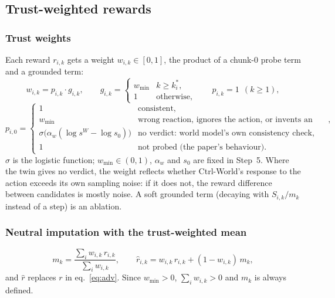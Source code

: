 \documentclass[11pt,a4paper]{article}
\theoremstyle{plain}
\theoremstyle{definition}
\theoremstyle{remark}
\begin{document}
\subsection{Trust-weighted rewards}\label{sec:trust}
\subsubsection{Trust weights}
Each reward $r_{i,k}$ gets a weight $w_{i,k}\in[0,1]$, the product of a chunk-0 probe term and a grounded term:
\begin{equation}
w_{i,k}=p_{i,k}\cdot g_{i,k},\qquad
g_{i,k}=\begin{cases}w_{\min}&k\ge k^\ast_i,\\ 1&\text{otherwise},\end{cases}\qquad
p_{i,k}=1\ \ (k\ge1),
\end{equation}
\begin{equation}
p_{i,0}=\begin{cases}
1 & \text{consistent},\\
w_{\min} & \text{wrong reaction, ignores the action, or invents an effect},\\
\sigma\big(\alpha_w(\log s^W-\log s_0)\big) & \text{no verdict: world model's own consistency check},\\
1 & \text{not probed (the paper's behaviour)}.
\end{cases}
\end{equation}
$\sigma$ is the logistic function; $w_{\min}\in(0,1)$, $\alpha_w$ and $s_0$ are fixed in Step~5. Where the twin gives no verdict, the weight reflects whether Ctrl-World's response to the action exceeds its own sampling noise: if it does not, the reward difference between candidates is mostly noise. A soft grounded term (decaying with $S_{i,k}/m_k$ instead of a step) is an ablation.

\subsubsection{Neutral imputation with the trust-weighted mean}
\begin{equation}\label{eq:neutral}
m_k=\frac{\sum_i w_{i,k}\,r_{i,k}}{\sum_i w_{i,k}},\qquad \hat r_{i,k}=w_{i,k}\,r_{i,k}+(1-w_{i,k})\,m_k,
\end{equation}
and $\hat r$ replaces $r$ in eq.~\eqref{eq:adv}. Since $w_{\min}>0$, $\sum_iw_{i,k}>0$ and $m_k$ is always defined.
\end{document}

